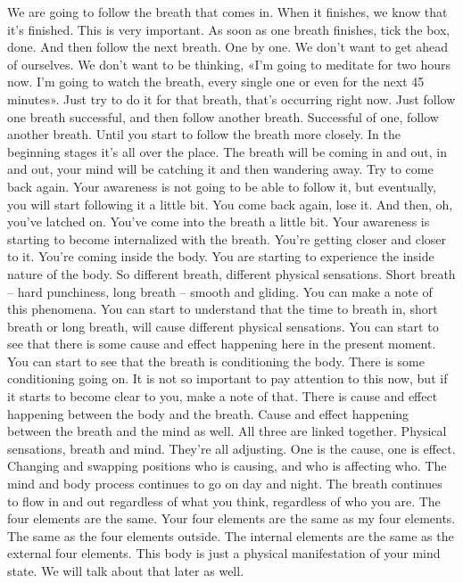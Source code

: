 \documentclass[letterpaper,10pt,english]{sphinxmanual}
\begin{document}
\sphinxAtStartPar
We are going to follow the breath that comes in. When it finishes, we
know that it’s finished. This is very important. As soon as one breath finishes,
tick the box, done. And then follow the next breath. One by one. We don’t
want to get ahead of ourselves. We don’t want to be thinking, «I’m going to
meditate for two hours now. I’m going to watch the breath, every single one
or even for the next 45 minutes». Just try to do it for that breath, that’s occurring right now. Just follow one breath successful, and then follow another
breath. Successful of one, follow another breath. Until you start to follow
the breath more closely. In the beginning stages it’s all over the place. The
breath will be coming in and out, in and out, your mind will be catching it
and then wandering away. Try to come back again. Your awareness is not
going to be able to follow it, but eventually, you will start following it a little
bit. You come back again, lose it. And then, oh, you’ve latched on. You’ve
come into the breath a little bit. Your awareness is starting to become internalized with the breath. You’re getting closer and closer to it. You’re coming
inside the body. You are starting to experience the inside nature of the body.
So different breath, different physical sensations. Short breath – hard
punchiness, long breath – smooth and gliding. You can make a note of this
phenomena.  You  can  start  to  understand  that  the  time  to  breath  in,  short
breath or long breath, will cause different physical sensations. You can start
to  see  that  there  is  some  cause  and  effect  happening  here  in  the  present
moment. You can start to see that the breath is conditioning the body. There
is  some  conditioning  going  on.  It  is  not  so  important  to  pay  attention  to
this now, but if it starts to become clear to you, make a note of that. There
is cause and effect happening between the body and the breath. Cause and
effect  happening  between  the  breath  and  the  mind  as  well.  All  three  are
linked  together.  Physical  sensations,  breath  and  mind.  They’re  all  adjusting. One is the cause, one is effect. Changing and swapping positions who
is causing, and who is affecting who. The mind and body process continues
to go on day and night. The breath continues to flow in and out regardless of
what you think, regardless of who you are. The four elements are the same.
Your four elements are the same as my four elements. The same as the four
  elements  outside.  The  internal  elements  are  the  same  as  the  external  four
elements. This body is just a physical manifestation of your mind state. We
will talk about that later as well.
\end{document}

